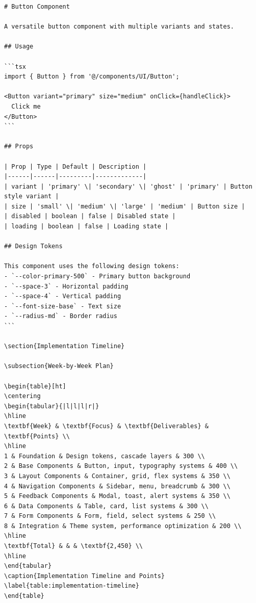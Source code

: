 \documentclass[11pt]{article}
\begin{document}
\begin{lstlisting}[style=markdown]
# Button Component

A versatile button component with multiple variants and states.

## Usage

```tsx
import { Button } from '@/components/UI/Button';

<Button variant="primary" size="medium" onClick={handleClick}>
  Click me
</Button>
```

## Props

| Prop | Type | Default | Description |
|------|------|---------|-------------|
| variant | 'primary' \| 'secondary' \| 'ghost' | 'primary' | Button style variant |
| size | 'small' \| 'medium' \| 'large' | 'medium' | Button size |
| disabled | boolean | false | Disabled state |
| loading | boolean | false | Loading state |

## Design Tokens

This component uses the following design tokens:
- `--color-primary-500` - Primary button background
- `--space-3` - Horizontal padding
- `--space-4` - Vertical padding
- `--font-size-base` - Text size
- `--radius-md` - Border radius
```

\section{Implementation Timeline}

\subsection{Week-by-Week Plan}

\begin{table}[ht]
\centering
\begin{tabular}{|l|l|l|r|}
\hline
\textbf{Week} & \textbf{Focus} & \textbf{Deliverables} & \textbf{Points} \\
\hline
1 & Foundation & Design tokens, cascade layers & 300 \\
2 & Base Components & Button, input, typography systems & 400 \\
3 & Layout Components & Container, grid, flex systems & 350 \\
4 & Navigation Components & Sidebar, menu, breadcrumb & 300 \\
5 & Feedback Components & Modal, toast, alert systems & 350 \\
6 & Data Components & Table, card, list systems & 300 \\
7 & Form Components & Form, field, select systems & 250 \\
8 & Integration & Theme system, performance optimization & 200 \\
\hline
\textbf{Total} & & & \textbf{2,450} \\
\hline
\end{tabular}
\caption{Implementation Timeline and Points}
\label{table:implementation-timeline}
\end{table}


\end{lstlisting}
\end{document}

